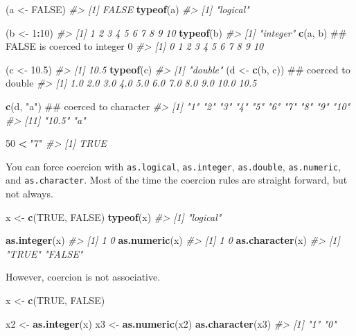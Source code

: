 \documentclass[]{book}
\newenvironment{Shaded}{\begin{snugshade}}{\end{snugshade}}
\newcommand{\KeywordTok}[1]{\textcolor[rgb]{0.13,0.29,0.53}{\textbf{#1}}}
\newcommand{\DecValTok}[1]{\textcolor[rgb]{0.00,0.00,0.81}{#1}}
\newcommand{\FloatTok}[1]{\textcolor[rgb]{0.00,0.00,0.81}{#1}}
\newcommand{\StringTok}[1]{\textcolor[rgb]{0.31,0.60,0.02}{#1}}
\newcommand{\CommentTok}[1]{\textcolor[rgb]{0.56,0.35,0.01}{\textit{#1}}}
\newcommand{\OtherTok}[1]{\textcolor[rgb]{0.56,0.35,0.01}{#1}}
\newcommand{\OperatorTok}[1]{\textcolor[rgb]{0.81,0.36,0.00}{\textbf{#1}}}
\newcommand{\NormalTok}[1]{#1}
\theoremstyle{definition}
\theoremstyle{definition}
\theoremstyle{definition}
\theoremstyle{remark}
\begin{document}
\begin{Shaded}
\begin{Highlighting}[]
\NormalTok{(a <-}\StringTok{ }\OtherTok{FALSE}\NormalTok{)}
\CommentTok{#> [1] FALSE}
\KeywordTok{typeof}\NormalTok{(a)}
\CommentTok{#> [1] "logical"}

\NormalTok{(b <-}\StringTok{ }\DecValTok{1}\OperatorTok{:}\DecValTok{10}\NormalTok{)}
\CommentTok{#>  [1]  1  2  3  4  5  6  7  8  9 10}
\KeywordTok{typeof}\NormalTok{(b)}
\CommentTok{#> [1] "integer"}
\KeywordTok{c}\NormalTok{(a, b)         ## FALSE is coerced to integer 0}
\CommentTok{#>  [1]  0  1  2  3  4  5  6  7  8  9 10}

\NormalTok{(c <-}\StringTok{ }\FloatTok{10.5}\NormalTok{)}
\CommentTok{#> [1] 10.5}
\KeywordTok{typeof}\NormalTok{(c)}
\CommentTok{#> [1] "double"}
\NormalTok{(d <-}\StringTok{ }\KeywordTok{c}\NormalTok{(b, c))  ## coerced to double}
\CommentTok{#>  [1]  1.0  2.0  3.0  4.0  5.0  6.0  7.0  8.0  9.0 10.0 10.5}

\KeywordTok{c}\NormalTok{(d, }\StringTok{"a"}\NormalTok{)       ## coerced to character}
\CommentTok{#>  [1] "1"    "2"    "3"    "4"    "5"    "6"    "7"    "8"    "9"    "10"  }
\CommentTok{#> [11] "10.5" "a"}

\DecValTok{50} \OperatorTok{<}\StringTok{ "7"}
\CommentTok{#> [1] TRUE}
\end{Highlighting}
\end{Shaded}

You can force coercion with \texttt{as.logical}, \texttt{as.integer},
\texttt{as.double}, \texttt{as.numeric}, and \texttt{as.character}. Most
of the time the coercion rules are straight forward, but not always.

\begin{Shaded}
\begin{Highlighting}[]
\NormalTok{x <-}\StringTok{ }\KeywordTok{c}\NormalTok{(}\OtherTok{TRUE}\NormalTok{, }\OtherTok{FALSE}\NormalTok{)}
\KeywordTok{typeof}\NormalTok{(x)}
\CommentTok{#> [1] "logical"}

\KeywordTok{as.integer}\NormalTok{(x)}
\CommentTok{#> [1] 1 0}
\KeywordTok{as.numeric}\NormalTok{(x)}
\CommentTok{#> [1] 1 0}
\KeywordTok{as.character}\NormalTok{(x)}
\CommentTok{#> [1] "TRUE"  "FALSE"}
\end{Highlighting}
\end{Shaded}

However, coercion is not associative.

\begin{Shaded}
\begin{Highlighting}[]
\NormalTok{x <-}\StringTok{ }\KeywordTok{c}\NormalTok{(}\OtherTok{TRUE}\NormalTok{, }\OtherTok{FALSE}\NormalTok{)}

\NormalTok{x2 <-}\StringTok{ }\KeywordTok{as.integer}\NormalTok{(x)}
\NormalTok{x3 <-}\StringTok{ }\KeywordTok{as.numeric}\NormalTok{(x2)}
\KeywordTok{as.character}\NormalTok{(x3)}
\CommentTok{#> [1] "1" "0"}
\end{Highlighting}
\end{Shaded}
\end{document}

